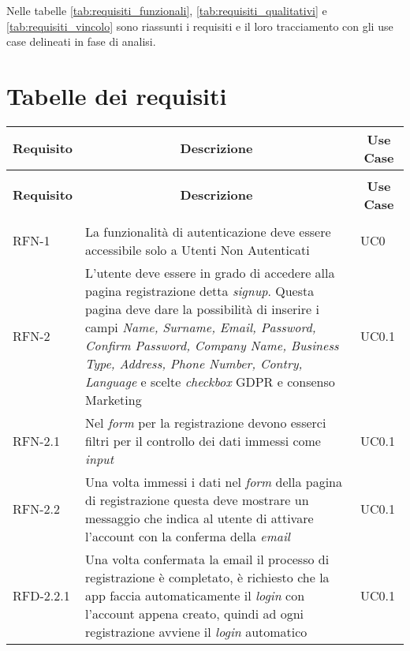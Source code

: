 Nelle tabelle \ref{tab:requisiti_funzionali}, \ref{tab:requisiti_qualitativi} e \ref{tab:requisiti_vincolo} sono riassunti i requisiti e il loro tracciamento con gli use case delineati in fase di analisi.

\section{Tabelle dei requisiti}


\begin{center}
    \begin{longtable}{|p{2.25cm}|p{7.75cm}|p{2.25cm}|}
    \hline
    \multicolumn{1}{|c|}{\textbf{Requisito}} & \multicolumn{1}{c|}{\textbf{Descrizione}} & \multicolumn{1}{c|}{\textbf{Use Case}}\\
    \hline 
    \endfirsthead
    \rowcolor{white}
    \multicolumn{3}{c}{{\bfseries \tablename\ \thetable{} -- Continuo della tabella}}\\
    \hline
    \multicolumn{1}{|c|}{\textbf{Requisito}} & \multicolumn{1}{c|}{\textbf{Descrizione}} & \multicolumn{1}{c|}{\textbf{Use Case}}\\
    \hline 
    \endhead
    \hline
    \rowcolor{white}
    \multicolumn{3}{|r|}{{Continua nella prossima pagina...}}\\
    \hline
    \endfoot
    \endlastfoot
    RFN-1 & La funzionalità di autenticazione deve essere accessibile solo a Utenti Non Autenticati & UC0 \\
    \hline
    RFN-2 & L'utente deve essere in grado di accedere alla pagina registrazione detta \textit{signup}. Questa pagina deve dare la possibilità di inserire i campi \textit{Name, Surname, Email, Password, Confirm Password, Company Name, Business Type, Address, Phone Number, Contry, Language} e scelte \textit{checkbox} GDPR e consenso Marketing & UC0.1 \\
    \hline
    RFN-2.1 & Nel \textit{form} per la registrazione devono esserci filtri per il controllo dei dati immessi come \textit{input} & UC0.1 \\
    \hline
    RFN-2.2 & Una volta immessi i dati nel \textit{form} della pagina di registrazione questa deve mostrare un messaggio che indica al utente di attivare l'account con la conferma della \textit{email} & UC0.1 \\
    \hline
    RFD-2.2.1 & Una volta confermata la email il processo di registrazione è completato, è richiesto che la app faccia automaticamente il \textit{login} con l'account appena creato, quindi ad ogni registrazione avviene il \textit{login} automatico & UC0.1 \\

\end{longtable}
\end{center}
